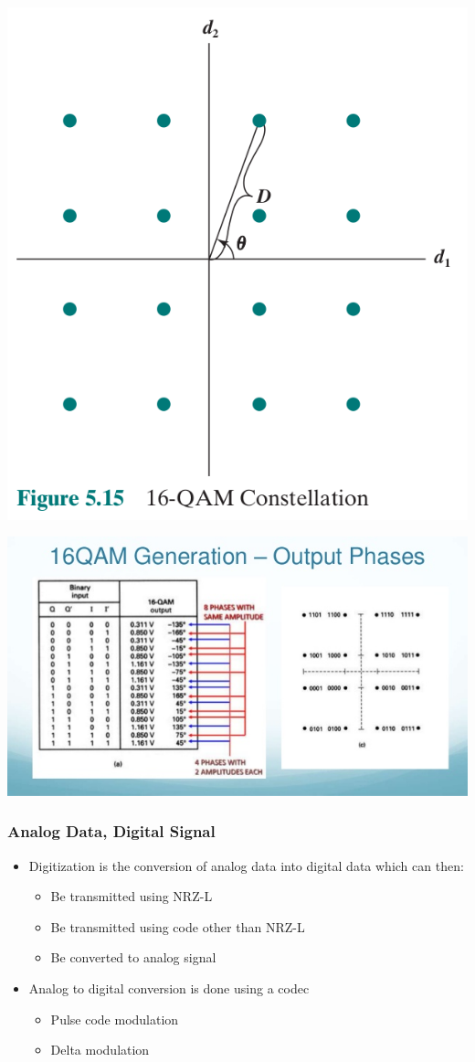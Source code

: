 \documentclass[pdflatex,compress]{beamer}
\begin{document}
\begin{frame}
	\begin{center}
		\includegraphics[width=0.5\linewidth]{img/img21}
	\end{center}
\end{frame}

\begin{frame}
	\begin{center}
		\includegraphics[width=\linewidth]{img/img22}
	\end{center}
\end{frame}

\begin{frame}
	\frametitle{Analog Data, Digital Signal}
	\begin{itemize}
		\item Digitization is the conversion of analog data into digital data which can then:
		\begin{itemize}
			\item Be transmitted using NRZ-L
			\item Be transmitted using code other than NRZ-L
			\item Be converted to analog signal
		\end{itemize}
		\item Analog to digital conversion is done using a codec
		\begin{itemize}
			\item Pulse code modulation
			\item Delta modulation
		\end{itemize}
	\end{itemize}
\end{frame}
\end{document}
